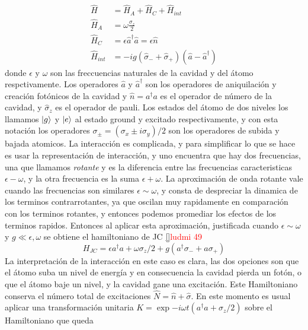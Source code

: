 \begin{equation}\label{eq3:hamiltoniano inicial}
\begin{aligned}
    \hat H & = \hat H_A + \hat H_C + \hat H_{int}  \\
    \hat H_A &= \omega \frac{\sigma_z}{2} \\
    \hat H_C &= \epsilon \hat a^\dagger\hat a = \epsilon \hat n \\
    \hat H_{int} &= -i g (\hat\sigma_-+\hat \sigma_+)(\hat a - \hat a^\dagger)
\end{aligned}
\end{equation}
donde $\epsilon$ y $\omega$ son las freccuencias naturales de la cavidad y del átomo respctivamente. Los operadores $\hat a$ y $\hat a^\dagger$ son los operadores de aniquilaci\'on y creaci\'on fot\'onicos de la cavidad y $\hat n =a^\dagger a$ es el operador de n\'umero de la cavidad, y $\hat \sigma_z$ es el operador de pauli. Los estados del átomo de dos niveles los llamamos $\ket{g}$ y $\ket{e}$ al estado ground y excitado respectivamente, y con esta notación los operadores $\sigma_\pm = (\sigma_x\pm i\sigma_y)/2$ son los operadores de subida y bajada atomicos. 
La interacci\'on es complicada, y para simplificar lo que se hace es usar la representaci\'on de interacci\'on, y uno encuentra que hay dos frecuencias, una que llamamos \textit{rotante} y es la diferencia entre las frecuencias caracteristicas $\epsilon-\omega$, y la otra frecuencia es la suma $\epsilon+\omega$. La aproximación de onda rotante vale cuando las frecuencias son similares $\epsilon\sim\omega$, y consta de despreciar la dinamica de los terminos contrarrotantes, ya que oscilan muy rapidamente en comparación con los terminos rotantes, y entonces podemos promediar los efectos de los terminos rapidos. Entonces al aplicar esta aproximación, justificada cuando $\epsilon\sim\omega$ y $g \ll \epsilon,\omega$ se obtiene el hamiltoniano de JC \ref{}\textcolor{red}{ludmi 49}
\begin{equation}
    H_{JC}=\epsilon a^\dagger a + \omega \sigma_z/2 + g(a^\dagger\sigma_-+a\sigma_+)
\end{equation} 
La interpretaci\'on de la interacci\'on en este caso es clara, las dos opciones son que el átomo suba un nivel de energ\'ia y en consecuencia la cavidad pierda un fot\'on, o que el átomo baje un nivel, y la cavidad gane una excitaci\'on. Este Hamiltoniano conserva el n\'umero total de excitaciones $\hat N= \hat n + \hat \sigma$. En este momento es usual aplicar una transformación unitaria $K=\exp{-i\omega t(a ^\dagger a + \sigma_z/2)}$ sobre el Hamiltoniano que queda 
